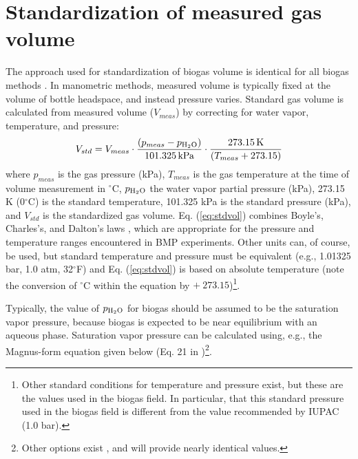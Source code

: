 \documentclass[]{article}
\newcommand{\unit}[1]{\ensuremath{\, \mathrm{#1}}}
\begin{document}
\section{Standardization of measured gas volume}
The approach used for standardization of biogas volume is identical for all biogas methods \citep{BMPdoc202man, BMPdoc204gasdens, BMPdoc201vol, BMPdoc203grav}.
In manometric methods, measured volume is typically fixed at the volume of bottle headspace, and instead pressure varies.
Standard gas volume is calculated from measured volume ($V_{meas}$) by correcting for water vapor, temperature, and pressure:
\begin{equation}
  \label{eq:stdvol}
  V_{std} = V_{meas} \cdot \frac{(p_{meas} - p\textsubscript{H$_2$O})} {101.325 \unit{kPa}} \cdot \frac {273.15 \unit{K}}{(T_{meas} + 273.15)}
\end{equation}
where $p_{meas}$ is the gas pressure (kPa), $T_{meas}$ is the gas temperature at the time of volume measurement in $^\circ$C, $p\textsubscript{H$_2$O}$ the water vapor partial pressure (kPa), 273.15 K (0$^\circ$C) is the standard temperature, 101.325 kPa is the standard pressure (kPa), and $V_{std}$ is the standardized gas volume.
Eq. (\ref{eq:stdvol}) combines Boyle's, Charles's, and Dalton's laws \citep{negiTextbookPhysicalChemistry1985}, which are appropriate for the pressure and temperature ranges encountered in BMP experiments.
Other units can, of course, be used, but standard temperature and pressure must be equivalent (e.g., 1.01325 bar, 1.0 atm, 32$^\circ$F) and Eq. (\ref{eq:stdvol}) is based on absolute temperature (note the conversion of $^\circ$C within the equation by $+~273.15$)\footnote{
  Other standard conditions for temperature and pressure exist, but these are the values used in the biogas field.
  In particular, that this standard pressure used in the biogas field is different from the value recommended by IUPAC (1.0 bar).
}.

Typically, the value of $p\textsubscript{H$_2$O}$ for biogas should be assumed to be the saturation vapor pressure, because biogas is expected to be near equilibrium with an aqueous phase.
Saturation vapor pressure can be calculated using, e.g., the Magnus-form equation given below (Eq. 21 in \citet{alduchovImprovedMagnusForm1996})\footnote{
  Other options exist \citep{richardsMethodsKineticanalysisMethane1991, vdiFermentationOrganicMaterials2016}, and will provide nearly identical values.
}.
\end{document}
